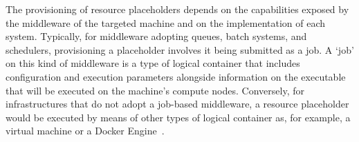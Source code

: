 \documentclass{sig-alternate}
\begin{document}



The provisioning of resource placeholders depends on the capabilities exposed by
the middleware of the targeted machine and on the implementation of each \pilot
system. Typically, for middleware adopting queues, batch systems, and
schedulers, provisioning a placeholder involves it being submitted as a job. A
`job' on this kind of middleware is a type of logical container that includes
configuration and execution parameters alongside information on the executable
that will be executed on the machine's compute nodes. Conversely, for
infrastructures that do not adopt a job-based middleware, a resource placeholder
would be executed by means of other types of logical container as, for example,
a virtual machine or a Docker Engine~\cite{bernstein2014,felter2014}.
\end{document}
